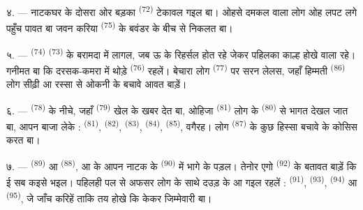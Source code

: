 ४. --- नाटकघर के दोसरा ओर बड़का  \textsuperscript{(72)}
टेकावल गइल बा। ओहसे दमकल वाला लोग ओह लपट लगे पहुँच पावत बा जवन करिया
 \textsuperscript{(75)} के बवंडर के बीच से निकलत बा।

\VUsaut{5.0mm}
\VUsaut{3.4mm}

५. ---  \textsuperscript{(74)} 
\textsuperscript{(73)} के बरामदा में लागल, जब ऊ  के रिहर्सल
होत रहे जेकर पहिलका  काल्ह होखे वाला रहे। गनीमत बा कि
दरसक-कमरा में थोड़े  \textsuperscript{(76)} रहलें। बेचारा लोग
 \textsuperscript{(77)} पर सरन लेलस, जहाँ हिम्मती
 \textsuperscript{(86)} लोग सीढ़ी आ रस्सा से ओकनी के
बचावे आवत बाड़ें।

६. ---  \textsuperscript{(78)} के नीचे, जहाँ
 \textsuperscript{(79)} खेल के खबर देत बा, ओहिजा
 \textsuperscript{(81)} लोग के 
\textsuperscript{(80)} से भागत देखल जात बा, आपन बाजा लेके :
 \textsuperscript{(81)},  \textsuperscript{(82)},
 \textsuperscript{(83)},  \textsuperscript{(84)},
 \textsuperscript{(85)}, वगैरह। लोग 
\textsuperscript{(87)} के कुछ हिस्सा बचावे के कोसिस करत बा।

७. ---  \textsuperscript{(89)} आ 
\textsuperscript{(88)},  आ  के आपन नाटक के
 \textsuperscript{(90)} में भागे के पड़ल। तेनोर एगो
 \textsuperscript{(92)} के बतावत बाड़ें कि ई सब कइसे भइल।
 पहिलही पल से अफसर लोग के साथे दउड़ के आ गइल रहलें :
 \textsuperscript{(91)}, 
\textsuperscript{(93)},  \textsuperscript{(94)} आ
 \textsuperscript{(95)}, जे जाँच करिहें ताकि तय
होखे कि केकर जिम्मेवारी बा।
